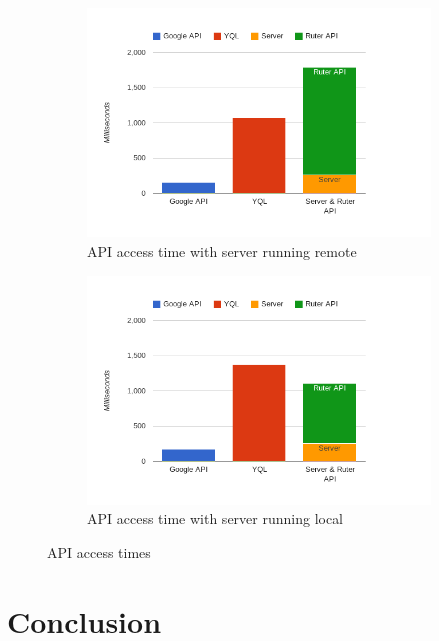 \documentclass[10pt,a4paper]{article}
\begin{document}
\begin{figure}
\centering
\begin{subfigure}{\textwidth}
\includegraphics[width=\textwidth]{../apitimes/apitiderHeroku}
\caption{API access time with server running remote}
\label{fig:time_heroku}
\end{subfigure}
\begin{subfigure}{\textwidth}
\includegraphics[width=\textwidth]{../apitimes/apitiderLocalhost}
\caption{API access time with server running local}
\label{fig:time_localhost}
\end{subfigure}
\caption{API access times}
\label{fig:time}
\end{figure}

\section{Conclusion}
\printbibliography
\end{document}
